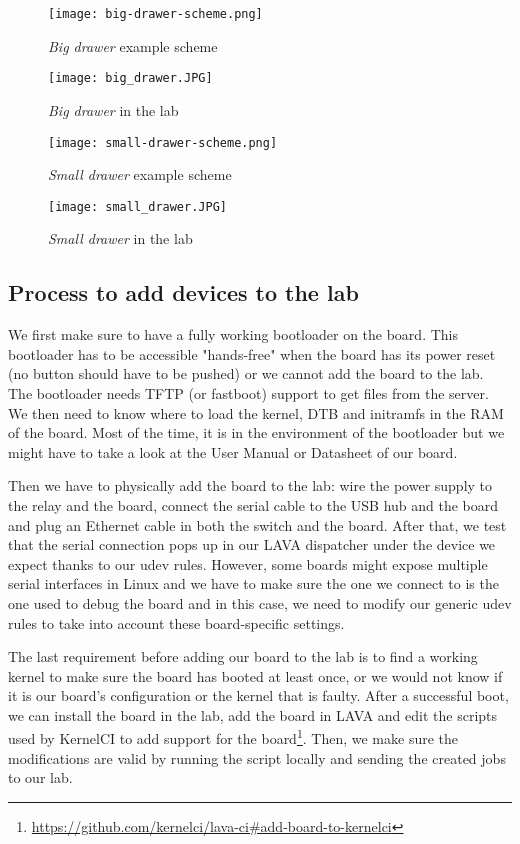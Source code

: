 \begin{figure}[H]
  \centering
  \texttt{[image: big-drawer-scheme.png]}
  \caption{\textit{Big drawer} example scheme}
\end{figure}
\begin{figure}[H]
  \texttt{[image: big\_drawer.JPG]}
  \caption{\textit{Big drawer} in the lab}
\end{figure}
\begin{figure}[H]
  \centering
  \texttt{[image: small-drawer-scheme.png]}
  \caption{\textit{Small drawer} example scheme}
\end{figure}
\begin{figure}[H]
  \texttt{[image: small\_drawer.JPG]}
  \caption{\textit{Small drawer} in the lab}
\end{figure}

\subsection{Process to add devices to the lab}

We first make sure to have a fully working bootloader on the board. This bootloader has to be accessible "hands-free" when the board has its power reset (no button should have to be pushed) or we cannot add the board to the lab. The bootloader needs TFTP (or fastboot) support to get files from the server. We then need to know where to load the kernel, DTB and initramfs in the RAM of the board. Most of the time, it is in the environment of the bootloader but we might have to take a look at the User Manual or Datasheet of our board.

Then we have to physically add the board to the lab: wire the power supply to the relay and the board, connect the serial cable to the USB hub and the board and plug an Ethernet cable in both the switch and the board. After that, we test that the serial connection pops up in our LAVA dispatcher under the device we expect thanks to our udev rules. However, some boards might expose multiple serial interfaces in Linux and we have to make sure the one we connect to is the one used to debug the board and in this case, we need to modify our generic udev rules to take into account these board-specific settings.

The last requirement before adding our board to the lab is to find a working kernel to make sure the board has booted at least once, or we would not know if it is our board's configuration or the kernel that is faulty. After a successful boot, we can install the board in the lab, add the board in LAVA and edit the scripts used by KernelCI to add support for the board\footnote{\url{https://github.com/kernelci/lava-ci\#add-board-to-kernelci}}. Then, we make sure the modifications are valid by running the script locally and sending the created jobs to our lab.

